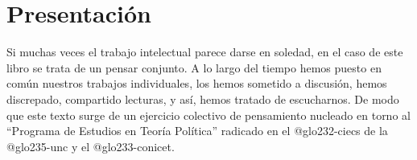 



\ifPDF

\usepackage[hyphenation,homeoarchy,homeoarchywordcolor=orange, homeoarchycharcolor=orange,draft]{impnattypo}
\usepackage[allcolors=magenta, colorlinks, unicode]{hyperref}
\usepackage{easyReview}
\usepackage{hyperxmp}

	\else
	\ifBNPDF
	\usepackage[width=18truecm,height=25.5truecm,cam,center]{crop}
	\newcommand*\infofont[1]{\sf{\footnotesize #1 (ja.vill4lba@gmail.com)}}
	\crop[font=infofont]
	\usepackage[hidelinks, unicode]{hyperref}
	\usepackage{hyperxmp}
	
		\else
		\ifPNGEPUB
		\usepackage[hidelinks, unicode]{hyperref}
			\else
			\ifHTMLEPUB
			\usepackage[allcolors=blue,colorlinks,hyperindex=true,unicode]{hyperref}
			\fi
		\fi
	\fi
\fi


\frontmatter

\ifHTMLEPUB
	\ifdefined\HCode
	\newpage
	\fi
\fi

\ifPDF

\tableofcontents
	\else
	\ifBNPDF
	
	\tableofcontents
		\else
		\ifPNGEPUB
		
		\tableofcontents
		\fi
	\fi
\fi

\ifHTMLEPUB
\tableofcontents
\fi

\chapter{Presentación}
\Author{ } %
\chaptermark{ }
\sectionmark{ } %

Si muchas veces el trabajo intelectual parece darse en soledad, en el caso de este libro se trata de un pensar conjunto. A lo largo del tiempo hemos puesto en común nuestros trabajos individuales, los hemos sometido a discusión, hemos discrepado, compartido lecturas, y así, hemos tratado de escucharnos. De modo que este texto surge de un ejercicio colectivo de pensamiento nucleado en torno al \enquote{Programa de Estudios en Teoría Política} radicado en el \gls{@glo232-ciecs} de la \gls{@glo235-unc} y el \gls{@glo233-conicet}.

